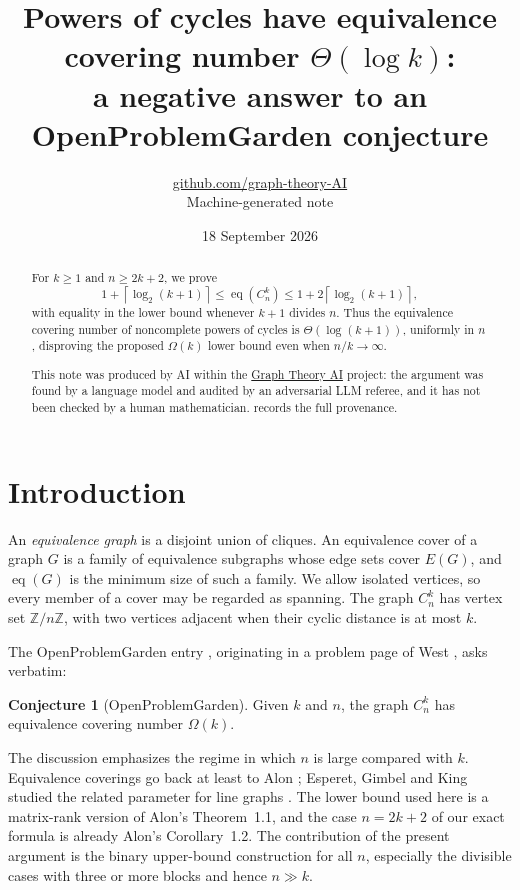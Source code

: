 \documentclass[11pt,a4paper]{article}
\title{Powers of cycles have equivalence covering number $\Theta(\log k)$:\\ a negative answer to an OpenProblemGarden conjecture}
\author{\href{https://github.com/graph-theory-AI}{github.com/graph-theory-AI}\\[2pt] \normalsize Machine-generated note}
\date{18 September 2026}
\theoremstyle{plain}
\theoremstyle{definition}
\newtheorem{conjecture}[theorem]{Conjecture}
\theoremstyle{remark}
\newcommand{\eqc}{\operatorname{eq}}
\newcommand{\Z}{\mathbb Z}
\newcommand{\ceil}[1]{\left\lceil #1\right\rceil}
\begin{document}
\maketitle

\begin{abstract}
For $k\ge1$ and $n\ge2k+2$, we prove
\[
  1+\ceil{\log_2(k+1)}\le \eqc(C_n^k)
  \le 1+2\ceil{\log_2(k+1)},
\]
with equality in the lower bound whenever $k+1$ divides $n$.  Thus the equivalence
covering number of noncomplete powers of cycles is $\Theta(\log(k+1))$, uniformly in
$n$, disproving the proposed $\Omega(k)$ lower bound even when $n/k\to\infty$.

\medskip\noindent\small This note was produced by AI within
the \href{https://github.com/graph-theory-AI/Graph-Theory-LLM-Proofs}{Graph Theory AI}
project: the argument was found by a language model and audited by an adversarial LLM
referee, and it has not been checked by a human mathematician. 
records the full provenance.
\end{abstract}

\section{Introduction}

An \emph{equivalence graph} is a disjoint union of cliques.  An equivalence cover of a
graph $G$ is a family of equivalence subgraphs whose edge sets cover $E(G)$, and
$\eqc(G)$ is the minimum size of such a family.  We allow isolated vertices, so every
member of a cover may be regarded as spanning.  The graph $C_n^k$ has vertex set
$\Z/n\Z$, with two vertices adjacent when their cyclic distance is at most $k$.

The OpenProblemGarden entry \cite{OPG}, originating in a problem page of West
\cite{West}, asks verbatim:
\begin{conjecture}[OpenProblemGarden]\label{conj:opg}
Given $k$ and $n$, the graph $C_n^k$ has equivalence covering number $\Omega(k)$.
\end{conjecture}
The discussion emphasizes the regime in which $n$ is large compared with $k$.
Equivalence coverings go back at least to Alon \cite{Alon86}; Esperet, Gimbel and King
studied the related parameter for line graphs \cite{EGK10}.  The lower bound used here
is a matrix-rank version of Alon's Theorem~1.1, and the case $n=2k+2$ of our exact
formula is already Alon's Corollary~1.2.  The contribution of the present argument is
the binary upper-bound construction for all $n$, especially the divisible cases with
three or more blocks and hence $n\gg k$.
\end{document}
